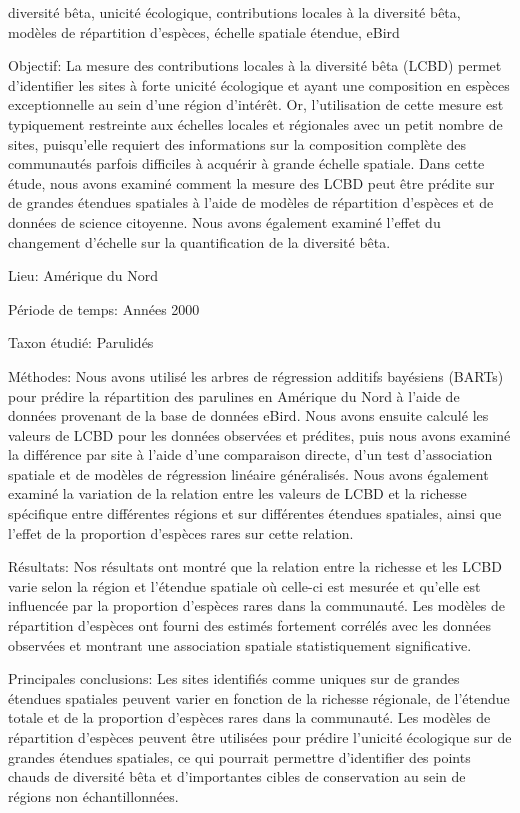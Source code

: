 \documentclass[12pt,twoside,maitrise]{template/dms}
\begin{document}
\begin{resume}{diversité bêta, unicité écologique, contributions locales à la diversité bêta, modèles de répartition d'espèces, échelle spatiale étendue, eBird}
  
  Objectif: La mesure des contributions locales à la diversité bêta (LCBD) permet d'identifier les sites à forte unicité écologique et ayant une composition en espèces exceptionnelle au sein d'une région d'intérêt. Or, l'utilisation de cette mesure est typiquement restreinte aux échelles locales et régionales avec un petit nombre de sites, puisqu'elle requiert des informations sur la composition complète des communautés parfois difficiles à acquérir à grande échelle spatiale. Dans cette étude, nous avons examiné comment la mesure des LCBD peut être prédite sur de grandes étendues spatiales à l'aide de modèles de répartition d'espèces et de données de science citoyenne. Nous avons également examiné l'effet du changement d'échelle sur la quantification de la diversité bêta.

  Lieu: Amérique du Nord
  
  Période de temps: Années 2000
  
  Taxon étudié: Parulidés
  
  Méthodes: Nous avons utilisé les arbres de régression additifs bayésiens (BARTs) pour prédire la répartition des parulines en Amérique du Nord à l'aide de données provenant de la base de données eBird. Nous avons ensuite calculé les valeurs de LCBD pour les données observées et prédites, puis nous avons examiné la différence par site à l'aide d'une comparaison directe, d'un test d'association spatiale et de modèles de régression linéaire généralisés. Nous avons également examiné la variation de la relation entre les valeurs de LCBD et la richesse spécifique entre différentes régions et sur différentes étendues spatiales, ainsi que l'effet de la proportion d'espèces rares sur cette relation.
  
  Résultats: Nos résultats ont montré que la relation entre la richesse et les LCBD varie selon la région et l'étendue spatiale où celle-ci est mesurée et qu'elle est influencée par la proportion d'espèces rares dans la communauté. Les modèles de répartition d'espèces ont fourni des estimés fortement corrélés avec les données observées et montrant une association spatiale statistiquement significative.
  
  Principales conclusions: Les sites identifiés comme uniques sur de grandes étendues spatiales peuvent varier en fonction de la richesse régionale, de l'étendue totale et de la proportion d'espèces rares dans la communauté. Les modèles de répartition d'espèces peuvent être utilisées pour prédire l'unicité écologique sur de grandes étendues spatiales, ce qui pourrait permettre d'identifier des points chauds de diversité bêta et d'importantes cibles de conservation au sein de régions non échantillonnées.

\end{resume}
\end{document}
